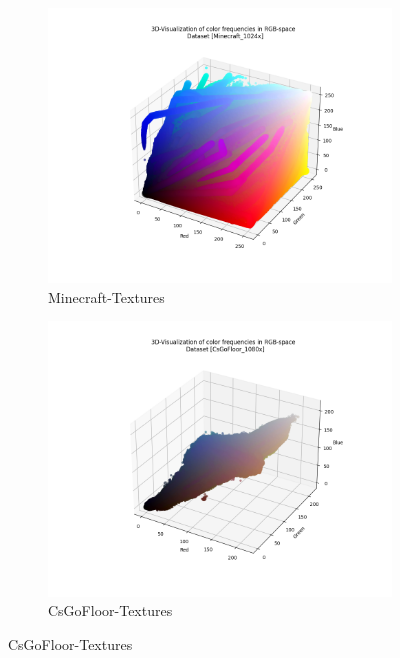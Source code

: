 \begin{figure}[htbp]
        \begin{subfigure}{.33\textwidth}
          \centering
          \includegraphics[width=\linewidth]{../code/dataAnalysis/output/Minecraft_1024x.png}
          \caption{Minecraft-Textures}
          \label{fig:dataset-Minecraft-Textures}
        \end{subfigure}%
        \hfill
        \begin{subfigure}{.33\textwidth}
          \centering
          \includegraphics[width=\linewidth]{../code/dataAnalysis/output/CsGoFloor_1080x.png}
          \caption{CsGoFloor-Textures}
          \label{fig:dataset-CsGoFloor-Textures}

\end{subfigure}
\end{figure}
